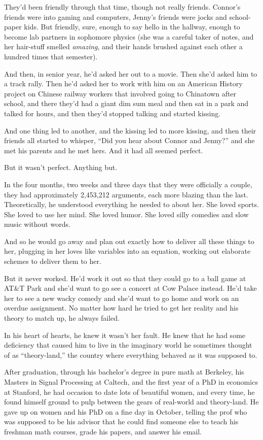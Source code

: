 They'd been friendly through that time, though not really friends.
Connor's friends were into gaming and computers, Jenny's friends
were jocks and school-paper kids. But friendly, sure, enough to say
hello in the hallway, enough to become lab partners in sophomore
physics (she was a careful taker of notes, and her hair-stuff
smelled \emph{amazing}, and their hands brushed against each other
a hundred times that semester).

And then, in senior year, he'd asked her out to a movie. Then she'd
asked him to a track rally. Then he'd asked her to work with him on
an American History project on Chinese railway workers that
involved going to Chinatown after school, and there they'd had a
giant dim sum meal and then sat in a park and talked for hours, and
then they'd stopped talking and started kissing.

And one thing led to another, and the kissing led to more kissing,
and then their friends all started to whisper, ``Did you hear about
Connor and Jenny?'' and she met his parents and he met hers. And it
had all seemed perfect.

But it wasn't perfect. Anything but.

In the four months, two weeks and three days that they were
officially a couple, they had approximately 2,453,212 arguments,
each more blazing than the last. Theoretically, he understood
everything he needed to about her. She loved sports. She loved to
use her mind. She loved humor. She loved silly comedies and slow
music without words.

And so he would go away and plan out exactly how to deliver all
these things to her, plugging in her loves like variables into an
equation, working out elaborate schemes to deliver them to her.

But it never worked. He'd work it out so that they could go to a
ball game at AT\&T Park and she'd want to go see a concert at Cow
Palace instead. He'd take her to see a new wacky comedy and she'd
want to go home and work on an overdue assignment. No matter how
hard he tried to get her reality and his theory to match up, he
always failed.

In his heart of hearts, he knew it wasn't her fault. He knew that
he had some deficiency that caused him to live in the imaginary
world he sometimes thought of as ``theory-land,'' the country where
everything behaved as it was supposed to.

After graduation, through his bachelor's degree in pure math at
Berkeley, his Masters in Signal Processing at Caltech, and the
first year of a PhD in economics at Stanford, he had occasion to
date lots of beautiful women, and every time, he found himself
ground to pulp between the gears of real-world and theory-land. He
gave up on women and his PhD on a fine day in October, telling the
prof who was supposed to be his advisor that he could find someone
else to teach his freshman math courses, grade his papers, and
answer his email.


